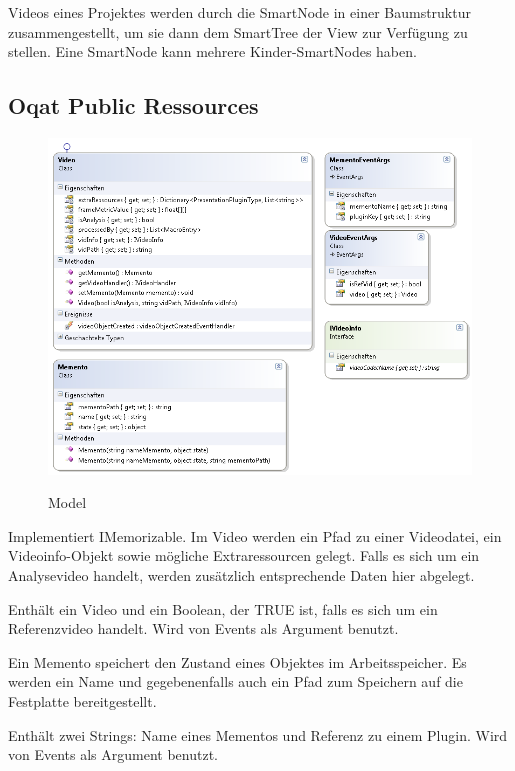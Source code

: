Videos eines Projektes werden durch die SmartNode in einer Baumstruktur zusammengestellt, um sie dann dem SmartTree der View zur Verfügung zu stellen. Eine SmartNode kann mehrere Kinder-SmartNodes haben.

\pagebreak
\subsection{Oqat Public Ressources}
\begin{figure}[h]
\noindent\includegraphics[width=\linewidth]{bilder/Klassendiagramm/publicModel.png}
\label{Private Model}
\caption{Model}
\end{figure}

Implementiert IMemorizable. Im Video werden ein Pfad zu einer Videodatei, ein Videoinfo-Objekt sowie mögliche Extraressourcen gelegt. Falls es sich um ein Analysevideo handelt, werden zusätzlich entsprechende Daten hier abgelegt.


Enthält ein Video und ein Boolean, der TRUE ist, falls es sich um ein Referenzvideo handelt. Wird von Events als Argument benutzt.


Ein Memento speichert den Zustand eines Objektes im Arbeitsspeicher. Es werden ein Name und gegebenenfalls auch ein Pfad zum Speichern auf die Festplatte bereitgestellt.


Enthält zwei Strings: Name eines Mementos und Referenz zu einem Plugin. Wird von Events als Argument benutzt.


